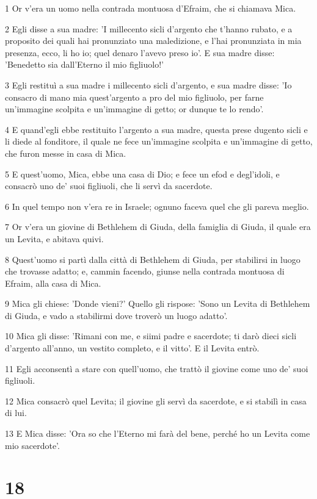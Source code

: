 \par 1 Or v'era un uomo nella contrada montuosa d'Efraim, che si chiamava Mica.
\par 2 Egli disse a sua madre: 'I millecento sicli d'argento che t'hanno rubato, e a proposito dei quali hai pronunziato una maledizione, e l'hai pronunziata in mia presenza, ecco, li ho io; quel denaro l'avevo preso io'. E sua madre disse: 'Benedetto sia dall'Eterno il mio figliuolo!'
\par 3 Egli restituì a sua madre i millecento sicli d'argento, e sua madre disse: 'Io consacro di mano mia quest'argento a pro del mio figliuolo, per farne un'immagine scolpita e un'immagine di getto; or dunque te lo rendo'.
\par 4 E quand'egli ebbe restituito l'argento a sua madre, questa prese dugento sicli e li diede al fonditore, il quale ne fece un'immagine scolpita e un'immagine di getto, che furon messe in casa di Mica.
\par 5 E quest'uomo, Mica, ebbe una casa di Dio; e fece un efod e degl'idoli, e consacrò uno de' suoi figliuoli, che li servì da sacerdote.
\par 6 In quel tempo non v'era re in Israele; ognuno faceva quel che gli pareva meglio.
\par 7 Or v'era un giovine di Bethlehem di Giuda, della famiglia di Giuda, il quale era un Levita, e abitava quivi.
\par 8 Quest'uomo si partì dalla città di Bethlehem di Giuda, per stabilirsi in luogo che trovasse adatto; e, cammin facendo, giunse nella contrada montuosa di Efraim, alla casa di Mica.
\par 9 Mica gli chiese: 'Donde vieni?' Quello gli rispose: 'Sono un Levita di Bethlehem di Giuda, e vado a stabilirmi dove troverò un luogo adatto'.
\par 10 Mica gli disse: 'Rimani con me, e siimi padre e sacerdote; ti darò dieci sicli d'argento all'anno, un vestito completo, e il vitto'. E il Levita entrò.
\par 11 Egli acconsentì a stare con quell'uomo, che trattò il giovine come uno de' suoi figliuoli.
\par 12 Mica consacrò quel Levita; il giovine gli servì da sacerdote, e si stabilì in casa di lui.
\par 13 E Mica disse: 'Ora so che l'Eterno mi farà del bene, perché ho un Levita come mio sacerdote'.

\chapter{18}

